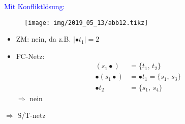 \textcolor{blue}{Mit Konfliktlösung:}
\begin{figure}[H]
	\centering
	\texttt{[image: img/2019\_05\_13/abb12.tikz]}
\end{figure}
\begin{itemize}
	\item ZM: nein, da z.B. $|\bullet t_1|=2$
	\item FC-Netz:
	\begin{align}
		(s_1 \bullet) &= \{t_1,\,t_2\} \\
		\bullet(s_1 \bullet) &= \bullet t_1 = \{s_1,\,s_3\} \\
		\bullet t_2 &= \{s_1,\,s_4\}
	\end{align}
	$\Rightarrow$ nein
\end{itemize}
	$\Rightarrow$ S/T-netz

